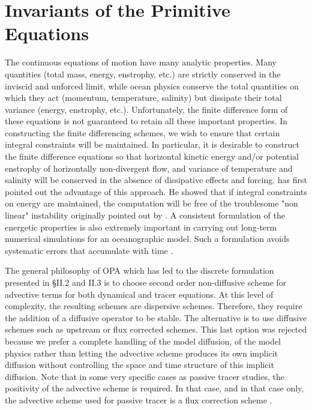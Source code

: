 \documentclass[../main/NEMO_manual]{subfiles}
\begin{document}
\chapter{Invariants of the Primitive Equations}
\label{chap:Invariant}
\minitoc

The continuous equations of motion have many analytic properties.
Many quantities (total mass, energy, enstrophy, etc.) are strictly conserved in the inviscid and unforced limit,
while ocean physics conserve the total quantities on which they act (momentum, temperature, salinity) but
dissipate their total variance (energy, enstrophy, etc.).
Unfortunately, the finite difference form of these equations is not guaranteed to
retain all these important properties.
In constructing the finite differencing schemes, we wish to ensure that
certain integral constraints will be maintained.
In particular, it is desirable to construct the finite difference equations so that
horizontal kinetic energy and/or potential enstrophy of horizontally non-divergent flow,
and variance of temperature and salinity will be conserved in the absence of dissipative effects and forcing.
\citet{Arakawa1966} has first pointed out the advantage of this approach.
He showed that if integral constraints on energy are maintained,
the computation will be free of the troublesome "non linear" instability originally pointed out by
\citet{Phillips1959}.
A consistent formulation of the energetic properties is also extremely important in carrying out
long-term numerical simulations for an oceanographic model.
Such a formulation avoids systematic errors that accumulate with time \citep{Bryan1997}.

The general philosophy of OPA which has led to the discrete formulation presented in {\S}II.2 and II.3 is to
choose second order non-diffusive scheme for advective terms for both dynamical and tracer equations.
At this level of complexity, the resulting schemes are dispersive schemes.
Therefore, they require the addition of a diffusive operator to be stable.
The alternative is to use diffusive schemes such as upstream or flux corrected schemes.
This last option was rejected because we prefer a complete handling of the model diffusion,
\ie of the model physics rather than letting the advective scheme produces its own implicit diffusion without
controlling the space and time structure of this implicit diffusion.
Note that in some very specific cases as passive tracer studies, the positivity of the advective scheme is required.
In that case, and in that case only, the advective scheme used for passive tracer is a flux correction scheme
\citep{Marti1992, Levy1996, Levy1998}.
\end{document}
